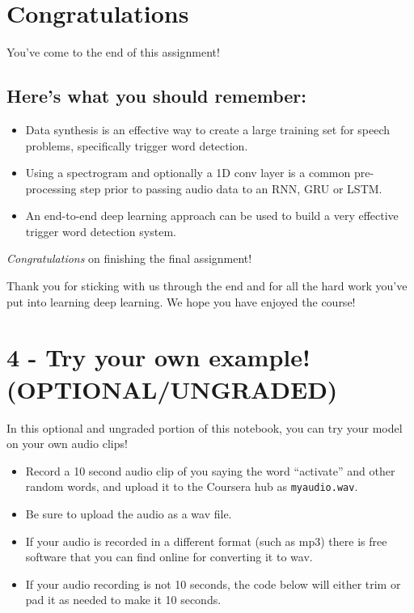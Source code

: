 \documentclass[11pt]{article}
\begin{document}
    \section{Congratulations}\label{congratulations}

You've come to the end of this assignment!

\subsection{Here's what you should
remember:}\label{heres-what-you-should-remember}

\begin{itemize}
\itemsep1pt\parskip0pt
\item
  Data synthesis is an effective way to create a large training set for
  speech problems, specifically trigger word detection.
\item
  Using a spectrogram and optionally a 1D conv layer is a common
  pre-processing step prior to passing audio data to an RNN, GRU or
  LSTM.
\item
  An end-to-end deep learning approach can be used to build a very
  effective trigger word detection system.
\end{itemize}

\emph{Congratulations} on finishing the final assignment!

Thank you for sticking with us through the end and for all the hard work
you've put into learning deep learning. We hope you have enjoyed the
course!

    \section{4 - Try your own example!
(OPTIONAL/UNGRADED)}\label{try-your-own-example-optionalungraded}

In this optional and ungraded portion of this notebook, you can try your
model on your own audio clips!

\begin{itemize}
\itemsep1pt\parskip0pt
\item
  Record a 10 second audio clip of you saying the word ``activate'' and
  other random words, and upload it to the Coursera hub as
  \texttt{myaudio.wav}.
\item
  Be sure to upload the audio as a wav file.
\item
  If your audio is recorded in a different format (such as mp3) there is
  free software that you can find online for converting it to wav.
\item
  If your audio recording is not 10 seconds, the code below will either
  trim or pad it as needed to make it 10 seconds.
\end{itemize}
\end{document}

